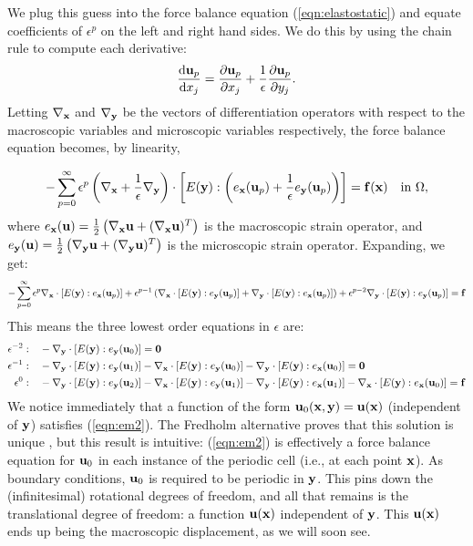 \documentclass[10pt]{article}
\providecommand{\e}{\epsilon}
\providecommand{\pder}[2]{\frac{\partial #1}{\partial #2}}
\providecommand{\tder}[2]{\frac{\mathrm{d} #1}{\mathrm{d} #2}}
\begin{document}
We plug this guess into the force balance equation (\ref{eqn:elastostatic}) and
equate coefficients of $\e^p$ on the left and right hand sides. We do this by
using the chain rule to compute each derivative:
$$
\tder{{\bf u}_p}{x_j} = \pder{{\bf u}_p}{x_j} + \frac{1}{\e} \pder{{\bf u}_p}{y_j}.
$$
Letting $\nabla_{\bf x}$ and $\nabla_{\bf y}$ be the vectors of differentiation
operators with respect to the macroscopic variables and microscopic variables
respectively, the force balance equation becomes, by linearity,

$$
-\sum_{p = 0}^\infty \e^p \left(\nabla_{\bf x} + \frac{1}{\e} \nabla_{\bf y}\right)
    \cdot \left[E({\bf y}) : \left(e_{\bf x}({\bf u}_p) + \frac{1}{\e} e_{\bf y}({\bf u}_p) \right) \right]
    = {\bf f}({\bf x}) \quad \text{in } \Omega,
$$
where $e_{\bf x}({\bf u}) = \frac{1}{2} \left( \nabla_{\bf x} {\bf u} + (\nabla_{\bf x}
{\bf u})^T \right)$ is the macroscopic strain operator, and $e_{\bf y}({\bf u}) =
\frac{1}{2} \left( \nabla_{\bf y} {\bf u} + (\nabla_{\bf y} {\bf u})^T \right)$
is the microscopic strain operator. Expanding, we get:
$$
-\sum_{p = 0}^\infty \e^p \nabla_{\bf x} \cdot [E({\bf y}) : e_{\bf x}({\bf u}_p)] +
\e^{p - 1} \left(\nabla_{\bf x} \cdot [E({\bf y}) : e_{\bf y}({\bf u}_p)] +
                 \nabla_{\bf y} \cdot [E({\bf y}) : e_{\bf x}({\bf u}_p)] \right) +
                 \e^{p - 2} \nabla_{\bf y} \cdot [E({\bf y}) : e_{\bf y}({\bf u}_p)] = {\bf f}
$$
This means the three lowest order equations in $\e$ are:
\begin{align}
    \e^{-2}:\quad  &-\nabla_{\bf y} \cdot [E({\bf y}) : e_{\bf y}({\bf u}_0)] = {\bf 0} \label{eqn:em2} \\
    \e^{-1}:\quad  &-\nabla_{\bf y} \cdot [E({\bf y}) : e_{\bf y}({\bf u}_1)] - 
                     \nabla_{\bf x} \cdot [E({\bf y}) : e_{\bf y}({\bf u}_0)] -
                     \nabla_{\bf y} \cdot [E({\bf y}) : e_{\bf x}({\bf u}_0)] = {\bf 0} \label{eqn:em1} \\
    \e^{ 0}:\quad  &-\nabla_{\bf y} \cdot [E({\bf y}) : e_{\bf y}({\bf u}_2)] - 
                     \nabla_{\bf x} \cdot [E({\bf y}) : e_{\bf y}({\bf u}_1)] -
                     \nabla_{\bf y} \cdot [E({\bf y}) : e_{\bf x}({\bf u}_1)] -
                     \nabla_{\bf x} \cdot [E({\bf y}) : e_{\bf x}({\bf u}_0)] = {\bf f} \label{eqn:e0}
\end{align}
We notice immediately that a function of the form ${\bf u}_0({\bf x}, {\bf y}) = {\bf u}({\bf x})$
(independent of ${\bf y}$) satisfies (\ref{eqn:em2}). The Fredholm alternative
proves that this solution is unique \cite[Lemma 2.3.21]{allaire2002shape}, but
this result is intuitive: (\ref{eqn:em2}) is effectively a force balance
equation for ${\bf u}_0$ in each instance of the periodic cell (i.e., at each
point ${\bf x}$). As boundary conditions, ${\bf u}_0$ is required to be
periodic in ${\bf y}$. This pins down the (infinitesimal) rotational degrees of
freedom, and all that remains is the translational degree of freedom: a
function ${\bf u}({\bf x})$ independent of ${\bf y}$. This ${\bf u}({\bf x})$ ends up
being the macroscopic displacement, as we will soon see.
\end{document}
